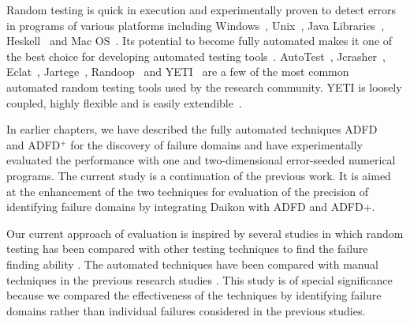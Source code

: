 Random testing is quick in execution and experimentally proven to detect errors in programs of various platforms including Windows~\cite{forrester2000empirical}, Unix~\cite{miller1990empirical}, Java Libraries~\cite{pacheco2005eclat}, Heskell~\cite{claessen2011quickcheck} and Mac OS~\cite{miller2006empirical}.  Its potential to become fully automated makes it one of the best choice for developing automated testing tools~\cite{csallner2004jcrasher, pacheco2005eclat}. AutoTest~\cite{ciupa2008predictability}, Jcrasher~\cite{csallner2004jcrasher}, Eclat~\cite{pacheco2005eclat}, Jartege~\cite{oriat2005jartege}, Randoop~\cite{pacheco2007randoop} and YETI~\cite{oriol2012random, ahmad2013adfd, ahmad2014adfd2} are a few of the most common automated random testing tools used by the research community. YETI is loosely coupled, highly flexible and is easily extendible~\cite{oriol2010testing}. 

In earlier chapters, we have described the fully automated techniques ADFD~\cite{ahmad2013adfd} and ADFD$^+$ \cite{ahmad2014adfd2} for the discovery of failure domains and have experimentally evaluated the performance with one and two-dimensional error-seeded numerical programs. The current study is a continuation of the previous work. It is aimed at the enhancement of the two techniques for evaluation of the precision of identifying failure domains by integrating Daikon with ADFD and ADFD+. 


Our current approach of evaluation is inspired by several studies in which random testing has been compared with other testing techniques to find the failure finding ability \cite{hamlet1990partition, weyuker1991analyzing, gutjahr1999partition}. The automated techniques have been compared with manual techniques in the previous research studies \cite{leitner2007reconciling, ciupa2008finding}. This study is of special significance because we compared the effectiveness of the techniques by identifying failure domains rather than individual failures considered in the previous studies.










